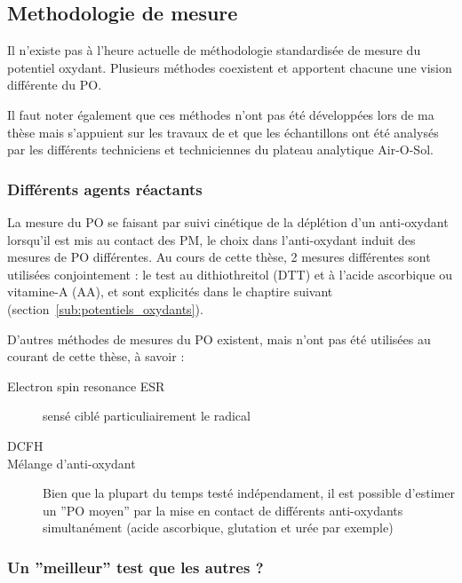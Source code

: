 \subsection{Methodologie de mesure}%
\label{sub:methodologie_de_mesure}

Il n'existe pas à l'heure actuelle de méthodologie standardisée de mesure du potentiel
oxydant. Plusieurs méthodes coexistent et apportent chacune une vision différente du PO.

Il faut noter également que ces méthodes n'ont pas été développées lors de ma thèse mais
s'appuient sur les travaux de \textcite{calasPollution2017} et que les échantillons ont été
analysés par les différents techniciens et techniciennes du plateau analytique Air-O-Sol.

\subsubsection{Différents agents réactants}%
\label{ssub:differents_agent_reactant}

La mesure du PO se faisant par suivi cinétique de la déplétion d'un anti-oxydant
lorsqu'il est mis au contact des PM, le choix dans l'anti-oxydant induit des mesures de PO
différentes. Au cours de cette thèse, 2 mesures différentes sont utilisées conjointement :
le test au dithiothreitol (DTT) et à l'acide ascorbique ou vitamine-A (AA), et sont
explicités dans le chaptire suivant (section~\ref{sub:potentiels_oxydants}).

D'autres méthodes de mesures du PO existent, mais n'ont pas été utilisées au courant de
cette thèse, à savoir :
\begin{description}
    \item[Electron spin resonance ESR] sensé ciblé particuliairement le radical
         \autocite{shiHydroxyl2003,shiTemporal2003}
    \item[DCFH]
    \item[Mélange d'anti-oxydant] Bien que la plupart du temps testé indépendament, il est
        possible d'estimer un ''PO moyen'' par la mise en contact de différents
        anti-oxydants simultanément (acide ascorbique, glutation et urée par exemple)~\autocite{calasComparison2018}
\end{description}

\subsubsection{Un ''meilleur'' test que les autres ?}%
\label{ssub:un_meilleur_test_que_les_autres_}

